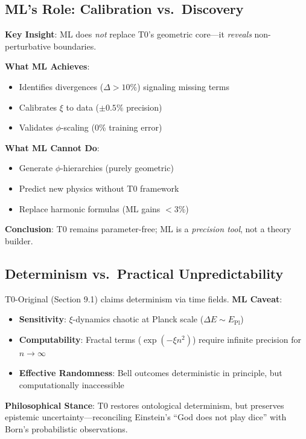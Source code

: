 	\subsection{ML's Role: Calibration vs.~Discovery}
	
	\textbf{Key Insight}: ML does \textit{not} replace T0's geometric core---it \textit{reveals} non-perturbative boundaries.
	
	\begin{tcolorbox}[colback=red!5!white,colframe=red!75!black,title={ML Limitations in T0}]
		\textbf{What ML Achieves}:
		\begin{itemize}
			\item Identifies divergences ($\Delta>10\%$) signaling missing terms
			\item Calibrates $\xi$ to data ($\pm0.5\%$ precision)
			\item Validates $\phi$-scaling (0\% training error)
		\end{itemize}
		\textbf{What ML Cannot Do}:
		\begin{itemize}
			\item Generate $\phi$-hierarchies (purely geometric)
			\item Predict new physics without T0 framework
			\item Replace harmonic formulas (ML gains $<3\%$)
		\end{itemize}
	\end{tcolorbox}
	
	\textbf{Conclusion}: T0 remains parameter-free; ML is a \textit{precision tool}, not a theory builder.
	
	\subsection{Determinism vs.~Practical Unpredictability}
	
	T0-Original (Section 9.1) claims determinism via time fields. \textbf{ML Caveat}:
	\begin{itemize}
		\item \textbf{Sensitivity}: $\xi$-dynamics chaotic at Planck scale ($\Delta E \sim E_{\text{Pl}}$)
		\item \textbf{Computability}: Fractal terms ($\exp(-\xi n^2)$) require infinite precision for $n\to\infty$
		\item \textbf{Effective Randomness}: Bell outcomes deterministic in principle, but computationally inaccessible
	\end{itemize}
	\textbf{Philosophical Stance}: T0 restores ontological determinism, but preserves epistemic uncertainty---reconciling Einstein's ``God does not play dice'' with Born's probabilistic observations.
	
